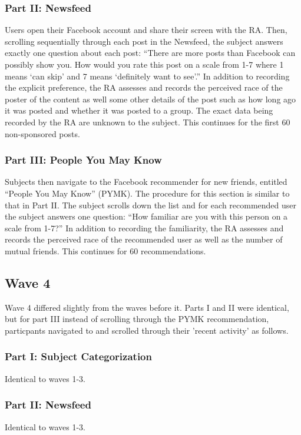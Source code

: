 \documentclass[12pt,letterpaper]{article}
\begin{document}
\subsubsection{Part II: Newsfeed} Users open their Facebook account and share their screen with the RA. Then, scrolling sequentially through each post in the Newsfeed, the subject answers exactly one question about each post: “There are more posts than Facebook can possibly show you. How would you rate this post on a scale from 1-7 where 1 means ‘can skip’ and 7 means ‘definitely want to see’.” In addition to recording the explicit preference, the RA assesses and records the perceived race of the poster of the content as well some other details of the post such as how long ago it was posted and whether it was posted to a group. The exact data being recorded by the RA are unknown to the subject. This continues for the first 60 non-sponsored posts.

\subsubsection{Part III: People You May Know} Subjects then navigate to the Facebook recommender for new friends, entitled “People You May Know” (PYMK). The procedure for this section is similar to that in Part II. The subject scrolls down the list and for each recommended user the subject answers one question: “How familiar are you with this person on a scale from 1-7?” In addition to recording the familiarity, the RA assesses and records the perceived race of the recommended user as well as the number of mutual friends. This continues for 60 recommendations.

\subsection{Wave 4}

Wave 4 differed slightly from the waves before it. Parts I and II were identical, but for part III instead of scrolling through the PYMK recommendation, particpants navigated to and scrolled through their 'recent activity' as follows.

\subsubsection{Part I: Subject Categorization} Identical to waves 1-3.

\subsubsection{Part II: Newsfeed} Identical to waves 1-3.
\end{document}
